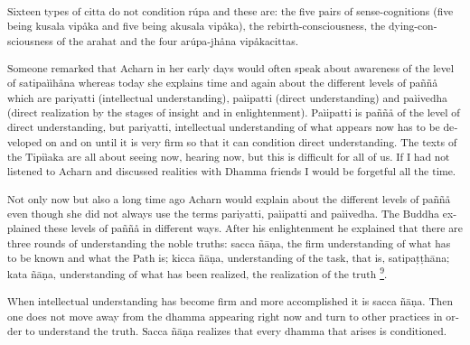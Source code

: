 \textsuperscript{\textdutch{Sixteen types of citta do not condition rúpa
and these are: the five pairs of sense-cognitions (five being kusala
vipåka and five being akusala vipåka), the rebirth-consciousness, the
dying-consciousness of the arahat and the four arúpa-jhåna vipåkacittas.
}}

\textsuperscript{\textdutch{Someone remarked that Acharn in her early
days would often speak about awareness of the level of satipaììhåna
whereas today she explains time and again about the different levels of
paññå which are pariyatti (intellectual understanding), paìipatti
(direct understanding) and paìivedha (direct realization by the stages
of insight and in enlightenment). Paìipatti is paññå of the level of
direct understanding, but pariyatti, intellectual understanding of what
appears now has to be developed on and on until it is very firm so that
it can condition direct understanding. The texts of the Tipiìaka are all
about seeing now, hearing now, but this is difficult for all of us. If I
had not listened to Acharn and discussed realities with Dhamma friends I
would be forgetful all the time. }}

\textsuperscript{\textdutch{Not only now but also a long time ago Acharn
would explain about the different levels of paññå even though she did
not always use the terms }pariyatti,
pa\textitalian{ì}\textenglish[variant=american]{ipatti and
pa}\textitalian{ì}\textenglish[variant=american]{ivedha}\textdutch{. The
Buddha explained these levels of paññå in different ways. After his
enlightenment he explained that there are three rounds of understanding
the noble truths: }\textitalian{sacca
}ña{{̄}}n{{̣}}\textenglish[variant=american]{a, the firm understanding of
what has to be known and what the Path is; kicca
}ña{{̄}}n{{̣}}\textenglish[variant=american]{a, understanding of the task,
that is, satipat}{{̣}}t{{̣}}ha{{̄}}na; kata
ña{{̄}}n{{̣}}\textenglish[variant=american]{a, understanding of what has
been realized, the realization of the truth}\textdutch{
\protect\hyperlink{sdfootnote9sym}{\textsuperscript{9}}}.}

\textsuperscript{\textdutch{When intellectual understanding has
be}\textenglish[variant=american]{come firm and more accomplished it
}\textitalian{is sacca }ña{{̄}}n{{̣}}\textenglish[variant=american]{a.
Then one does not move away from the dhamma appearing right now and turn
to other practices in order to understand the truth. Sacca
}ña{{̄}}n{{̣}}\textenglish[variant=american]{a realizes that every dhamma
that arises is conditioned. }}

